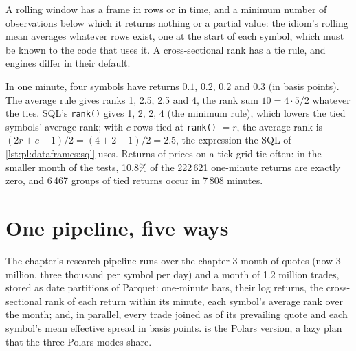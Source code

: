A rolling window has a frame in rows or in time, and a minimum number of observations below which it returns nothing or a partial
value: the idiom's rolling mean averages whatever rows exist, one at the start of each symbol, which must be known to the code that uses
it. A cross-sectional rank has a tie rule, and engines differ in their default.

\begin{example}\label{ex:pl:dataframes:ties}
In one minute, four symbols have returns $0.1$, $0.2$, $0.2$ and $0.3$ (in basis points). The average rule gives ranks 1,
2.5, 2.5 and 4, the rank sum $10 = 4\cdot5/2$ whatever the ties. SQL's \texttt{rank()} gives 1, 2, 2, 4 (the minimum rule), which lowers
the tied symbols' average rank; with $c$ rows tied at \texttt{rank()} $= r$, the average rank is $(2r + c - 1)/2 = (4 + 2 - 1)/2 = 2.5$,
the expression the SQL of \cref{lst:pl:dataframes:sql} uses. Returns of prices on a tick grid tie often: in the smaller month of the
tests, 10.8\% of the 222\,621 one-minute returns are exactly zero, and 6\,467 groups of tied returns occur in 7\,808 minutes.
\end{example}

\section{One pipeline, five ways}

The chapter's research pipeline runs over the chapter-3 month of quotes (now 3 million, three thousand per symbol per day) and a
month of 1.2 million trades, stored as date partitions of Parquet: one-minute bars, their log returns, the cross-sectional rank of
each return within its minute, each symbol's average rank over the month; and, in parallel, every trade joined as of its prevailing
quote and each symbol's mean effective spread in basis points.  is the Polars version, a lazy plan
that the three Polars modes share.

\label{lst:pl:dataframes:lazy}

\label{lst:pl:dataframes:sql}


